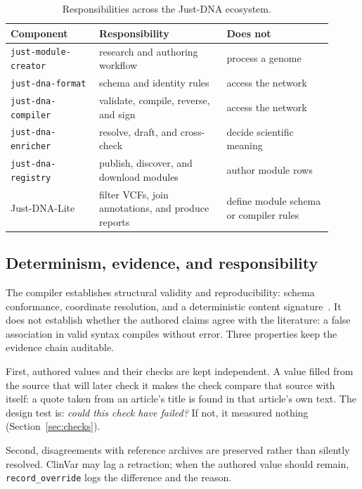 \documentclass[11pt,a4paper]{article}
\begin{document}
\begin{table}[ht]
\centering
\caption{Responsibilities across the Just-DNA ecosystem.}
\label{tab:packages}
\small
\begin{tabular}{@{}p{0.25\linewidth}p{0.36\linewidth}p{0.30\linewidth}@{}}
\toprule
Component & Responsibility & Does not \\
\midrule
\texttt{just-module-creator} & research and authoring workflow & process a genome \\
\texttt{just-dna-format} & schema and identity rules & access the network \\
\texttt{just-dna-compiler} & validate, compile, reverse, and sign & access the network \\
\texttt{just-dna-enricher} & resolve, draft, and cross-check & decide scientific meaning \\
\texttt{just-dna-registry} & publish, discover, and download modules & author module rows \\
Just-DNA-Lite & filter VCFs, join annotations, and produce reports & define module schema or compiler rules \\
\bottomrule
\end{tabular}
\end{table}

\subsection{Determinism, evidence, and responsibility}

The compiler establishes structural validity and reproducibility: schema
conformance, coordinate resolution, and a deterministic content
signature~\citep{justdnaformat2026}. It does not establish whether the authored
claims agree with the literature: a false association in valid syntax
compiles without error. Three properties keep the evidence chain auditable.

First, authored values and their checks are kept independent. A value filled
from the source that will later check it makes the check compare that source
with itself: a quote taken from an article's title is found in that
article's own text. The design test is: \emph{could this check have failed?} If not,
it measured nothing (Section~\ref{sec:checks}).

Second, disagreements with reference archives are preserved rather than
silently resolved. ClinVar may lag a retraction; when the authored value
should remain, \texttt{record\_override} logs the difference and the reason.
\end{document}
